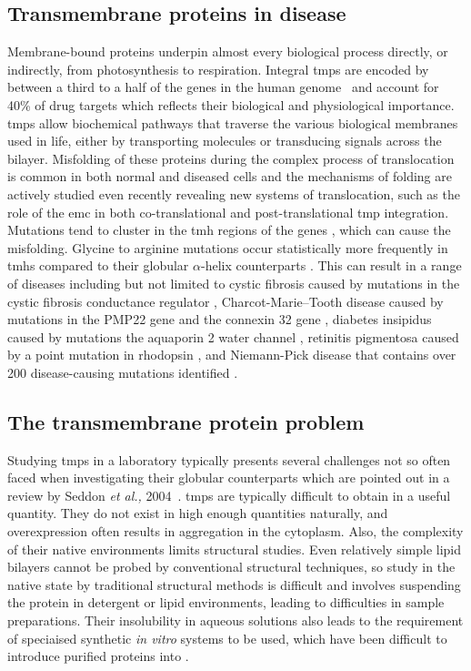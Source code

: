 \subsection{Transmembrane proteins in disease}
Membrane\--bound proteins underpin almost every biological process directly, or indirectly, from photosynthesis to respiration.
Integral \gls{tmp}s are encoded by between a third to a half of the genes in the human genome~\cite{Hopkins2002, Almen2009, Wang2013} and account for 40\% of drug targets \cite{Overington2006} which reflects their biological and physiological importance.
\gls{tmp}s allow biochemical pathways that traverse the various biological membranes used in life, either by transporting molecules or transducing signals across the bilayer.
Misfolding of these proteins during the complex process of translocation is common in both normal and diseased cells and the mechanisms of folding are actively studied even recently revealing new systems of translocation, such as the role of the \gls{emc} in both co\--translational \cite{Shurtleff2018} and post\--translational \cite{Guna2018} \gls{tmp} integration.
Mutations tend to cluster in the \gls{tmh} regions of the genes \cite{Sanders2004}, which can cause the misfolding.
Glycine to arginine mutations occur statistically more frequently in \gls{tmh}s compared to their globular $\alpha$\--helix counterparts \cite{Partridge2002}.
This can result in a range of diseases including but not limited to cystic fibrosis caused by mutations in the cystic fibrosis conductance regulator \cite{Riordan1989}, Charcot\--Marie\---Tooth disease caused by mutations in the PMP22 gene \cite{Roa1993} and the connexin 32 gene \cite{Fairweather1994}, diabetes insipidus caused by mutations the aquaporin 2 water channel \cite{vanLieburg1994}, retinitis pigmentosa caused by a point mutation in rhodopsin \cite{Dryja1990}, and Niemann\--Pick disease that contains over 200 disease\--causing mutations identified \cite{Gelsthorpe2008, Park2003, Scott2004, Fernandez-Valero2005}.

\subsection{The transmembrane protein problem}

Studying \gls{tmp}s in a laboratory typically presents several challenges not so often faced when investigating their globular counterparts which are pointed out in a review by Seddon \textit{et al.,} 2004~\cite{Seddon2004}.
\gls{tmp}s are typically difficult to obtain in a useful quantity.
They do not exist in high enough quantities naturally, and overexpression often results in aggregation in the cytoplasm.
Also, the complexity of their native environments limits structural studies.
Even relatively simple lipid bilayers cannot be probed by conventional structural techniques, so study in the native state by traditional structural methods is difficult and involves suspending the protein in detergent or lipid environments, leading to difficulties in sample preparations.
Their insolubility in aqueous solutions also leads to the requirement of speciaised synthetic \textit{in vitro} systems to be used, which have been difficult to introduce purified proteins into \cite{Seddon2004}.


